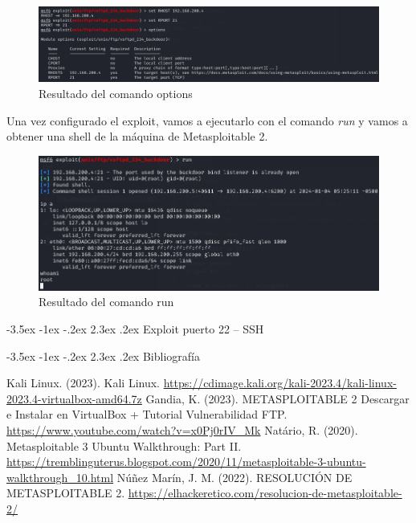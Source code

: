 \documentclass[11pt]{report}
\makeatletter
\renewcommand\chapter{\@startsection{chapter}{0}{\z@}%
    {-3.5ex \@plus -1ex \@minus -.2ex}%
    {2.3ex \@plus.2ex}%
    {\normalfont\Large\bfseries}}
\makeatother
\begin{document}
\begin{figure}[H]
  \centering
  \includegraphics[scale=0.51]{img/options_vsftpd.png}
  \caption{Resultado del comando options}
\end{figure}

Una vez configurado el exploit, vamos a ejecutarlo con el comando \emph{run} y vamos a obtener una shell de la máquina de Metasploitable 2.
\begin{figure}[H]
  \centering
  \includegraphics[scale=0.6]{img/run_vsftpd.png}
  \caption{Resultado del comando run}
\end{figure}

\chapter{Exploit puerto 22 – SSH}

\newpage

\chapter{Bibliografía} %
\begin{thebibliography}{99}
   Kali Linux. (2023). Kali Linux. \url{https://cdimage.kali.org/kali-2023.4/kali-linux-2023.4-virtualbox-amd64.7z}
   Gandia, K. (2023). METASPLOITABLE 2 Descargar e Instalar en VirtualBox + Tutorial Vulnerabilidad FTP. \url{https://www.youtube.com/watch?v=x0Pj0rIV_Mk}
   Natário, R. (2020). Metasploitable 3 Ubuntu Walkthrough: Part II. \url{https://tremblinguterus.blogspot.com/2020/11/metasploitable-3-ubuntu-walkthrough_10.html}
   Núñez Marín, J. M. (2022). RESOLUCIÓN DE METASPLOITABLE 2. \url{https://elhackeretico.com/resolucion-de-metasploitable-2/}
\end{thebibliography}
\end{document}
